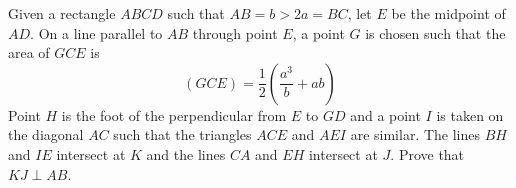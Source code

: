Given a rectangle $ABCD$ such that $AB = b > 2a = BC$, let $E$ be the midpoint of $AD$. On a line parallel to $AB$ through point $E$, a point $G$ is chosen such that the area of $GCE$ is
$$(GCE)= \frac12 \left(\frac{a^3}{b}+ab\right)$$Point $H$ is the foot of the perpendicular from $E$ to $GD$ and a point $I$ is taken on the diagonal $AC$ such that the triangles $ACE$ and $AEI$ are similar. The lines $BH$ and $IE$ intersect at $K$ and the lines $CA$ and $EH$ intersect at $J$. Prove that $KJ \perp AB$.